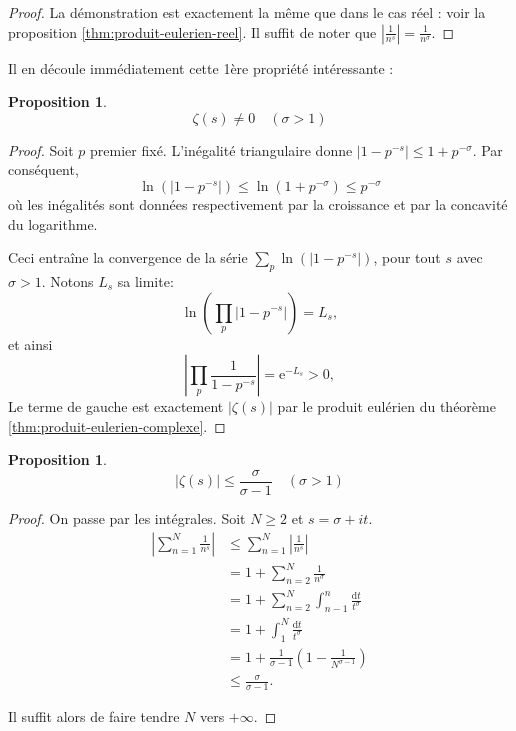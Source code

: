 \documentclass[french]{report}
\newtheorem{proposition}[theorem]{Proposition}
\begin{document}
\begin{proof}
  La démonstration est exactement la même que dans le cas réel : voir la proposition \ref{thm:produit-eulerien-reel}. Il suffit de noter que $|\frac{1}{n^s}|=\frac{1}{n^\sigma}$.
\end{proof}

Il en découle immédiatement cette 1ère propriété intéressante :

\begin{proposition}\label{eq:zeta-non-nul-produit-eulerien}
  \[ \zeta(s) \neq 0 \quad(\sigma > 1)\]
\end{proposition}

\begin{proof}
  Soit $p$ premier fixé. L'inégalité triangulaire donne $|1-p^{-s}|\leq1+p^{-\sigma}$. Par conséquent,
  \[\ln(|1-p^{-s}|)\leq\ln(1+p^{-\sigma})\leq p^{-\sigma} \]
  où les inégalités sont données respectivement par la croissance et par la concavité du logarithme.

  Ceci entraîne la convergence de la série $\sum_p\ln(|1-p^{-s}|)$, pour tout $s$ avec $\sigma>1$. Notons $L_s$ sa limite:
  \[ \ln\left(\prod_p|1-p^{-s}|\right) = L_s, \]
  et ainsi
  \[ \left|\prod_p\frac{1}{1-p^{-s}}\right| = \mathrm{e}^{-L_s} > 0, \]
  Le terme de gauche est exactement $|\zeta(s)|$ par le produit eulérien du théorème \ref{thm:produit-eulerien-complexe}.

\end{proof}

\begin{proposition}\label{prop:zeta-majoration-facile}
  \[ |\zeta(s)|\leq\frac{\sigma}{\sigma-1}\quad(\sigma>1) \]
\end{proposition}

\begin{proof}
  On passe par les intégrales. Soit $N\geq2$ et $s=\sigma+it$.
  \begin{align*}
    \left|\sum_{n=1}^N\frac{1}{n^s}\right|
    &\leq \sum_{n=1}^N\left|\frac{1}{n^s}\right| \\
    &= 1 + \sum_{n=2}^N\frac{1}{n^\sigma} \\
    &= 1 + \sum_{n=2}^N\int_{n-1}^n\frac{\mathrm{d}t}{t^\sigma} \\
    &= 1 + \int_{1}^N\frac{\mathrm{d}t}{t^\sigma} \\
    &= 1 + \frac{1}{\sigma-1}\left(1-\frac{1}{N^{\sigma-1}}\right) \\
    &\leq \frac{\sigma}{\sigma-1}.
  \end{align*}

  Il suffit alors de faire tendre $N$ vers $+\infty$.
\end{proof}
\end{document}
